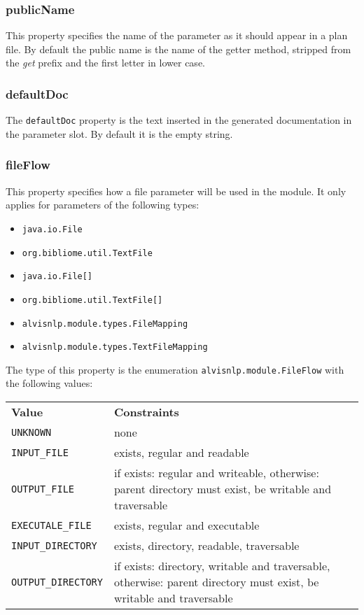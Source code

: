 \documentclass[a4paper]{article}
\begin{document}
\subsubsection{publicName}
This property specifies the name of the parameter as it should appear in a plan file.
By default the public name is the name of the getter method, stripped from the \emph{get} prefix and the first letter in lower case.

\subsubsection{defaultDoc}
The \texttt{defaultDoc} property is the text inserted in the generated documentation in the parameter slot.
By default it is the empty string.

\subsubsection{fileFlow}
This property specifies how a file parameter will be used in the module.
It only applies for parameters of the following types:
\begin{itemize}
\item \texttt{java.io.File}
\item \texttt{org.bibliome.util.TextFile}
\item \texttt{java.io.File[]}
\item \texttt{org.bibliome.util.TextFile[]}
\item \texttt{alvisnlp.module.types.FileMapping}
\item \texttt{alvisnlp.module.types.TextFileMapping}
\end{itemize}

The type of this property is the enumeration \texttt{alvisnlp.module.FileFlow} with the following values:
\begin{tabular}[hptb]{lll}
  \textbf{Value}             & \textbf{Constraints}\\
  \texttt{UNKNOWN}           & none\\
  \texttt{INPUT\_FILE}       & exists, regular and readable\\
  \texttt{OUTPUT\_FILE}      & if exists: regular and writeable, otherwise: parent directory must exist, be writable and traversable\\
  \texttt{EXECUTALE\_FILE}   & exists, regular and executable\\
  \texttt{INPUT\_DIRECTORY}  & exists, directory, readable, traversable\\
  \texttt{OUTPUT\_DIRECTORY} & if exists: directory, writable and traversable, otherwise: parent directory must exist, be writable and traversable\\
\end{tabular}
\end{document}
